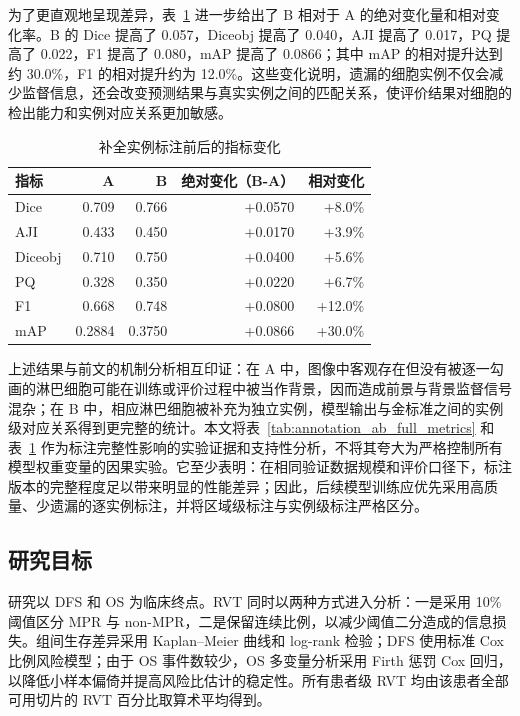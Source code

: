 为了更直观地呈现差异，表~\ref{tab:annotation_ab_delta} 进一步给出了 B 相对于 A 的绝对变化量和相对变化率。B 的 Dice 提高了 0.057，Diceobj 提高了 0.040，AJI 提高了 0.017，PQ 提高了 0.022，F1 提高了 0.080，mAP 提高了 0.0866；其中 mAP 的相对提升达到约 30.0\%，F1 的相对提升约为 12.0\%。这些变化说明，遗漏的细胞实例不仅会减少监督信息，还会改变预测结果与真实实例之间的匹配关系，使评价结果对细胞的检出能力和实例对应关系更加敏感。

\begin{table}[htbp]
  \centering
  \caption{补全实例标注前后的指标变化}
  \label{tab:annotation_ab_delta}
  \small
  \begin{tabular}{lrrrr}
    \toprule
    指标 & A & B & 绝对变化（B-A） & 相对变化 \\
    \midrule
    Dice & 0.709 & 0.766 & +0.0570 & +8.0\% \\

    AJI & 0.433 & 0.450 & +0.0170 & +3.9\% \\
    Diceobj & 0.710 & 0.750 & +0.0400 & +5.6\% \\
    PQ & 0.328 & 0.350 & +0.0220 & +6.7\% \\
    F1 & 0.668 & 0.748 & +0.0800 & +12.0\% \\
    mAP & 0.2884 & 0.3750 & +0.0866 & +30.0\% \\
    \bottomrule
  \end{tabular}
\end{table}

上述结果与前文的机制分析相互印证：在 A 中，图像中客观存在但没有被逐一勾画的淋巴细胞可能在训练或评价过程中被当作背景，因而造成前景与背景监督信号混杂；在 B 中，相应淋巴细胞被补充为独立实例，模型输出与金标准之间的实例级对应关系得到更完整的统计。本文将表~\ref{tab:annotation_ab_full_metrics} 和表~\ref{tab:annotation_ab_delta} 作为标注完整性影响的实验证据和支持性分析，不将其夸大为严格控制所有模型权重变量的因果实验。它至少表明：在相同验证数据规模和评价口径下，标注版本的完整程度足以带来明显的性能差异；因此，后续模型训练应优先采用高质量、少遗漏的逐实例标注，并将区域级标注与实例级标注严格区分。

\subsection{研究目标}
研究以 DFS 和 OS 为临床终点。RVT 同时以两种方式进入分析：一是采用 10\% 阈值区分 MPR 与 non-MPR，二是保留连续比例，以减少阈值二分造成的信息损失。组间生存差异采用 Kaplan--Meier 曲线和 log-rank 检验；DFS 使用标准 Cox 比例风险模型；由于 OS 事件数较少，OS 多变量分析采用 Firth 惩罚 Cox 回归，以降低小样本偏倚并提高风险比估计的稳定性。所有患者级 RVT 均由该患者全部可用切片的 RVT 百分比取算术平均得到。

